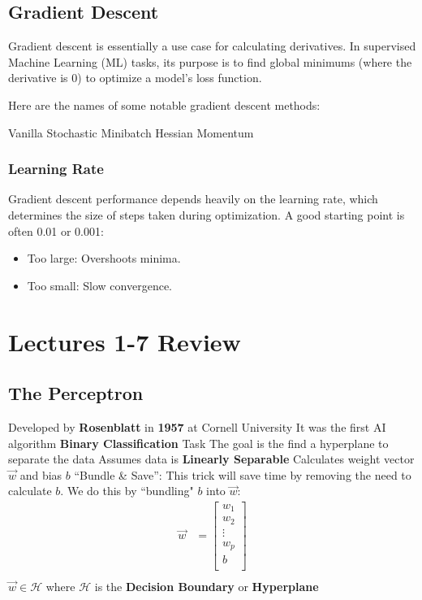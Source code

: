 \subsection{Gradient Descent}
Gradient descent \cite{goodfellow2016deep} is essentially a use case for calculating derivatives. In supervised Machine Learning (ML) tasks, its purpose is to find global minimums (where the derivative is 0) to optimize a model's loss function. 


Here are the names of some notable gradient descent methods:
\begin{outline}
    \1 Vanilla
    \1 Stochastic
    \1 Minibatch
    \1 Hessian
    \1 Momentum

\end{outline}
\subsubsection{Learning Rate}
Gradient descent performance depends heavily on the learning rate, which determines the size of steps taken during optimization. A good starting point is often 0.01 or 0.001:
\begin{itemize}
    \item Too large: Overshoots minima.
    \item Too small: Slow convergence.
\end{itemize}
\section{Lectures 1-7 Review}

\subsection{The Perceptron\cite{rosenblatt1958perceptron}}
\begin{outline}
    \1 Developed by \textbf{Rosenblatt} in \textbf{1957} at Cornell University
    \1 It was the first AI algorithm
    \1 \textbf{Binary Classification} Task
    \1 The goal is the find a hyperplane to separate the data
    \1 Assumes data is \textbf{Linearly Separable}
    \1 Calculates weight vector $\vec{w}$ and bias $b$ 
    \1 ``Bundle \& Save'': This trick will save time by removing the need to calculate $b$. We do this by ``bundling" $b$ into $\vec{w}$: 
    \begin{align*}
    \vec{w} &= \begin{bmatrix}
           w_{1}    \\
           w_{2}    \\
           \vdots   \\
           w_{p}    \\
           b        \\
         \end{bmatrix} \\
    \end{align*}
    \1 $\vec{w} \in \mathcal{H}$ where $\mathcal{H}$ is the \textbf{Decision Boundary} or \textbf{Hyperplane}
    
\end{outline}

